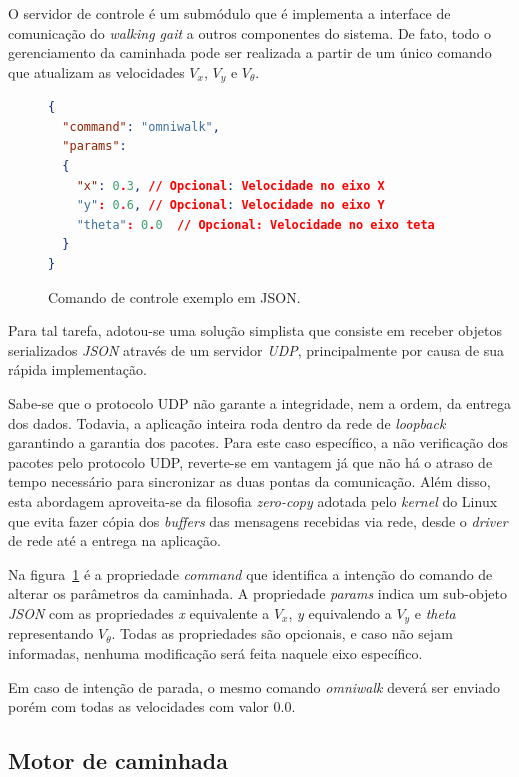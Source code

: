O servidor de controle é um submódulo que é implementa a interface de comunicação do \textit{walking gait} a outros componentes do sistema. De fato, todo o gerenciamento da caminhada pode ser realizada a partir de um único comando que atualizam as velocidades $V_x$, $V_y$ e $V_\theta$.

\begin{figure}[htb]
	\begin{lstlisting}[language=json,firstnumber=1]
{
  "command": "omniwalk",
  "params":
  {
    "x": 0.3, // Opcional: Velocidade no eixo X
    "y": 0.6, // Opcional: Velocidade no eixo Y
    "theta": 0.0  // Opcional: Velocidade no eixo teta
  }
}
	\end{lstlisting}
	\caption{Comando de controle exemplo em JSON.}
	\label{fig:architecture:walkinggait:controller:json}
\end{figure}

Para tal tarefa, adotou-se uma solução simplista que consiste em receber objetos serializados \textit{JSON} através de um servidor \textit{UDP}, principalmente por causa de sua rápida implementação.

Sabe-se que o protocolo UDP não garante a integridade, nem a ordem, da entrega dos dados. Todavia, a aplicação inteira roda dentro da rede de \textit{loopback} garantindo a garantia dos pacotes. Para este caso específico, a não verificação dos pacotes pelo protocolo UDP, reverte-se em vantagem já que não há o atraso de tempo necessário para sincronizar as duas pontas da comunicação. Além disso, esta abordagem aproveita-se da filosofia \textit{zero-copy} adotada pelo \textit{kernel} do Linux \cite{tianhua2008} que evita fazer cópia dos \textit{buffers} das mensagens recebidas via rede, desde o \textit{driver} de rede até a entrega na aplicação.

Na figura~\ref{fig:architecture:walkinggait:controller:json} é a propriedade \textit{command} que identifica a intenção do comando de alterar os parâmetros da caminhada. A propriedade \textit{params} indica um sub-objeto \textit{JSON} com as propriedades \textit{x} equivalente a $V_x$, \textit{y} equivalendo a $V_y$ e \textit{theta} representando $V_\theta$. Todas as propriedades são opcionais, e caso não sejam informadas, nenhuma modificação será feita naquele eixo específico.

Em caso de intenção de parada, o mesmo comando \textit{omniwalk} deverá ser enviado porém com todas as velocidades com valor $0.0$.

\subsection{Motor de caminhada}

